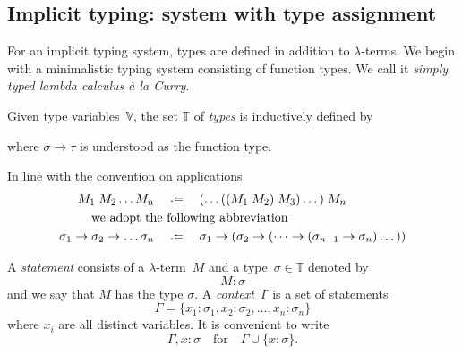 \subsection{Implicit typing: system with type assignment}
For an implicit typing system, types are defined in addition to $\lambda$-terms.
We begin with a minimalistic typing system consisting of function types. We call it
\emph{simply typed lambda calculus \textit{\`a la} Curry}.
\begin{definition}
  Given type variables~$\mathbb{V}$, the set $\mathbb{T}$ of
  \emph{types} is inductively defined by
  \begin{multicols}{2}
    \begin{prooftree}
    \end{prooftree}
    \begin{prooftree}
    \end{prooftree}
  \end{multicols}
  where $\sigma\to\tau$ is understood as the function type.
\end{definition}
\begin{convention}
  In line with the convention on applications
  \begin{align*}
    M_1\;M_2 \dots M_n \quad &\defeq\quad
    (\dots ((M_1\;M_2)\;M_3) \dots)\; M_n \\
    \text{we adopt the } & \text{following abbreviation} \\
    \sigma_1 \to \sigma_2 \to \dots \sigma_n
    \quad & \defeq\quad \sigma_1 \to (\sigma_2 \to (
    \dots \to (\sigma_{n-1} \to \sigma_n)\dots))
  \end{align*}
\end{convention}
\begin{definition}
    A \emph{statement} consists of a $\lambda$-term~$M$ and a type~$\sigma \in
    \mathbb{T}$ denoted by 
      \[
        M : \sigma
      \]
    and we say that $M$ has the type $\sigma$.  A \emph{context}~$\Gamma$ is a
    set of statements 
      \[
        \Gamma = \{x_1 : \sigma_1, x_2 : \sigma_2, \ldots, x_n : \sigma_n\}
      \]
      where $x_i$ are all distinct variables. It is convenient to write 
      \[
        \Gamma, x : \sigma\quad\text{for}\quad\Gamma\cup \{x : \sigma\}.
      \]
\end{definition}
